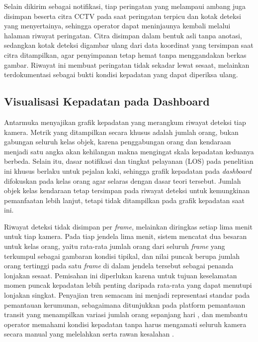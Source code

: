 Selain dikirim sebagai notifikasi, tiap peringatan yang melampaui ambang juga disimpan 
beserta citra CCTV pada saat peringatan terpicu dan kotak deteksi yang menyertainya, 
sehingga operator dapat meninjaunya kembali melalui halaman riwayat peringatan. Citra 
disimpan dalam bentuk asli tanpa anotasi, sedangkan kotak deteksi digambar ulang dari 
data koordinat yang tersimpan saat citra ditampilkan, agar penyimpanan tetap hemat tanpa 
menggandakan berkas gambar. Riwayat ini membuat peringatan tidak sekadar lewat sesaat, 
melainkan terdokumentasi sebagai bukti kondisi kepadatan yang dapat diperiksa ulang.

\subsection{Visualisasi Kepadatan pada Dashboard}

Antarmuka menyajikan grafik kepadatan yang merangkum riwayat deteksi tiap kamera. Metrik 
yang ditampilkan secara khusus adalah jumlah orang, bukan gabungan seluruh kelas objek, 
karena penggabungan orang dan kendaraan menjadi satu angka akan kehilangan makna mengingat 
skala kepadatan keduanya berbeda. Selain itu, dasar notifikasi dan tingkat pelayanan (LOS) 
pada penelitian ini khusus berlaku untuk pejalan kaki, sehingga grafik kepadatan pada 
\textit{dashboard} difokuskan pada kelas orang agar selaras dengan dasar teori tersebut. 
Jumlah objek kelas kendaraan tetap tersimpan pada riwayat deteksi untuk kemungkinan 
pemanfaatan lebih lanjut, tetapi tidak ditampilkan pada grafik kepadatan saat ini.

Riwayat deteksi tidak disimpan per \textit{frame}, melainkan diringkas setiap lima menit 
untuk tiap kamera. Pada tiap jendela lima menit, sistem mencatat dua besaran untuk kelas 
orang, yaitu rata-rata jumlah orang dari seluruh \textit{frame} yang terkumpul sebagai 
gambaran kondisi tipikal, dan nilai puncak berupa jumlah orang tertinggi pada satu 
\textit{frame} di dalam jendela tersebut sebagai penanda lonjakan sesaat. Pemisahan ini 
diperlukan karena untuk tujuan keselamatan momen puncak kepadatan lebih penting daripada 
rata-rata yang dapat menutupi lonjakan singkat. Penyajian tren semacam ini menjadi 
representasi standar pada pemantauan kerumunan, sebagaimana ditunjukkan pada platform 
pemantauan transit yang menampilkan variasi jumlah orang sepanjang hari 
\cite{apeksha2025transit}, dan membantu operator memahami kondisi kepadatan tanpa harus 
mengamati seluruh kamera secara manual yang melelahkan serta rawan kesalahan 
\cite{wong2024fusion}.

